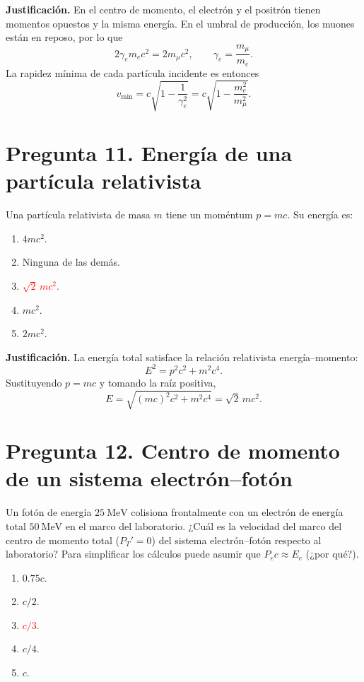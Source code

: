 \documentclass[a4paper,11pt]{article}
\newcommand{\pregunta}[2]{\section*{Pregunta #1. #2}}
\begin{document}
\begin{figure}[H]
\centering

\end{figure}

\textbf{Justificación.} En el centro de momento, el electrón y el positrón tienen momentos opuestos y la misma energía. En el umbral de producción, los muones están en reposo, por lo que
\[
2\gamma_e m_ec^2=2m_\mu c^2,
\qquad \gamma_e=\frac{m_\mu}{m_e}.
\]
La rapidez mínima de cada partícula incidente es entonces
\[
v_{\min}=c\sqrt{1-\frac{1}{\gamma_e^2}}
=c\sqrt{1-\frac{m_e^2}{m_\mu^2}}.
\]

\pregunta{11}{Energía de una partícula relativista}

Una partícula relativista de masa $m$ tiene un moméntum $p=mc$. Su energía es:

\begin{enumerate}
    \item $4mc^2$.
    \item Ninguna de las demás.
    \item \textcolor{red}{$\sqrt{2}\,mc^2$.}
    \item $mc^2$.
    \item $2mc^2$.
\end{enumerate}

\textbf{Justificación.} La energía total satisface la relación relativista energía--momento:
\[
E^2=p^2c^2+m^2c^4.
\]
Sustituyendo $p=mc$ y tomando la raíz positiva,
\[
E=\sqrt{(mc)^2c^2+m^2c^4}=\sqrt{2}\,mc^2.
\]


\pregunta{12}{Centro de momento de un sistema electrón--fotón}

Un fotón de energía $25\ \mathrm{MeV}$ colisiona frontalmente con un electrón de energía total $50\ \mathrm{MeV}$ en el marco del laboratorio. ¿Cuál es la velocidad del marco del centro de momento total ($P_T'=0$) del sistema electrón--fotón respecto al laboratorio? Para simplificar los cálculos puede asumir que $P_ec\approx E_e$ (¿por qué?).

\begin{enumerate}
    \item $0.75c$.
    \item $c/2$.
    \item \textcolor{red}{$c/3$.}
    \item $c/4$.
    \item $c$.
\end{enumerate}

\begin{figure}[H]
\centering

\end{figure}
\end{document}
